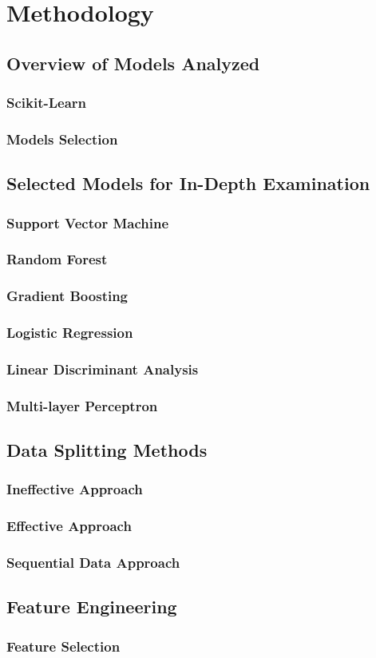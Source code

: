 %
%
\chapter{Methodology}
    \section{Overview of Models Analyzed}
        \subsection{Scikit-Learn}  
        \subsection{Models Selection}
    \section{Selected Models for In-Depth Examination}
        \subsection{Support Vector Machine}
        \subsection{Random Forest}
        \subsection{Gradient Boosting}
        \subsection{Logistic Regression}
        \subsection{Linear Discriminant Analysis}
        \subsection{Multi-layer Perceptron}
    \section{Data Splitting Methods}
        \subsection{Ineffective Approach}
        \subsection{Effective Approach}
        \subsection{Sequential Data Approach}
    \section{Feature Engineering}
        \subsection{Feature Selection}

\cleardoublepage